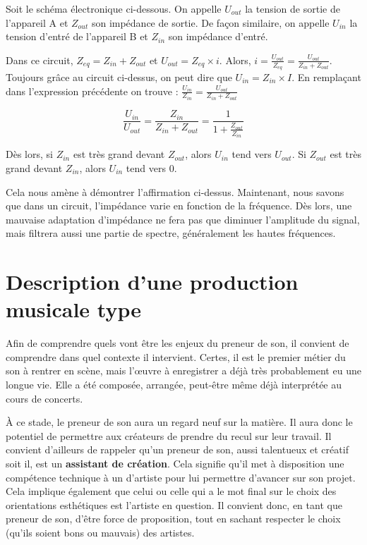 \documentclass[
]{book}
\begin{document}
Soit le schéma électronique ci-dessous. On appelle \(U_{out}\) la tension de sortie de l'appareil A et \(Z_{out}\) son impédance de sortie. De façon similaire, on appelle \(U_{in}\) la tension d'entré de l'appareil B et \(Z_{in}\) son impédance d'entré.

Dans ce circuit, \(Z_{eq} = Z_{in} + Z_{out}\) et \(U_{out} = Z_{eq} \times i\). Alors, \(i = \frac{U_{out}}{Z_{eq}} = \frac{U_{out}}{Z_{in} + Z_{out}}\). Toujours grâce au circuit ci-dessus, on peut dire que \(U_{in} = Z_{in} \times I\). En remplaçant dans l'expression précédente on trouve : \(\frac{U_{in}}{Z_{in}} = \frac{U_{out}}{Z_{in} + Z_{out}}\)

\[ \frac{U_{in}}{U_{out}} = \frac{Z_{in}}{Z_{in} + Z_{out}} = \frac{1}{1+\frac{Z_{out}}{Z_{in}}} \]

Dès lors, si \(Z_{in}\) est très grand devant \(Z_{out}\), alors \(U_{in}\) tend vers \(U_{out}\). Si \(Z_{out}\) est très grand devant \(Z_{in}\), alors \(U_{in}\) tend vers \(0\).

Cela nous amène à démontrer l'affirmation ci-dessus. Maintenant, nous savons que dans un circuit, l'impédance varie en fonction de la fréquence. Dès lors, une mauvaise adaptation d'impédance ne fera pas que diminuer l'amplitude du signal, mais filtrera aussi une partie de spectre, généralement les hautes fréquences.

\hypertarget{description-dune-production-musicale-type}{%
\chapter{Description d'une production musicale type}\label{description-dune-production-musicale-type}}

Afin de comprendre quels vont être les enjeux du preneur de son, il convient de comprendre dans quel contexte il intervient. Certes, il est le premier métier du son à rentrer en scène, mais l'œuvre à enregistrer a déjà très probablement eu une longue vie. Elle a été composée, arrangée, peut-être même déjà interprétée au cours de concerts.

À ce stade, le preneur de son aura un regard neuf sur la matière. Il aura donc le potentiel de permettre aux créateurs de prendre du recul sur leur travail. Il convient d'ailleurs de rappeler qu'un preneur de son, aussi talentueux et créatif soit il, est un \textbf{assistant de création}. Cela signifie qu'il met à disposition une compétence technique à un d'artiste pour lui permettre d'avancer sur son projet. Cela implique également que celui ou celle qui a le mot final sur le choix des orientations esthétiques est l'artiste en question. Il convient donc, en tant que preneur de son, d'être force de proposition, tout en sachant respecter le choix (qu'ils soient bons ou mauvais) des artistes.
\end{document}
